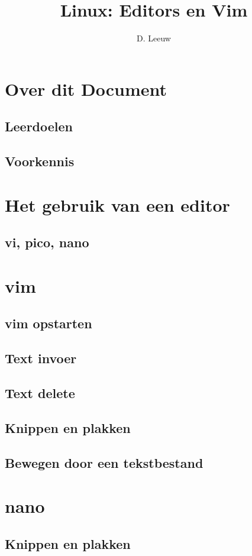 \documentclass[a4paper,12pt,twoside,openright,titlepage]{article}
\author{D. Leeuw}
\title{Linux: Editors en Vim}
\date{\today\\
1.0.0\\
\vfill
\raggedright
\copyright\ 2020-2025 Dennis Leeuw\\
}
\begin{document}

\maketitle


\section{Over dit Document}
\subsection{Leerdoelen}

\subsection{Voorkennis}



\section{Het gebruik van een editor}

\subsection{vi, pico, nano}


\section{vim}

\subsection{vim opstarten}

\subsection{Text invoer}

\subsection{Text delete}

\subsection{Knippen en plakken}

\subsection{Bewegen door een tekstbestand}


\section{nano}

\subsection{Knippen en plakken}



\printindex
\end{document}
